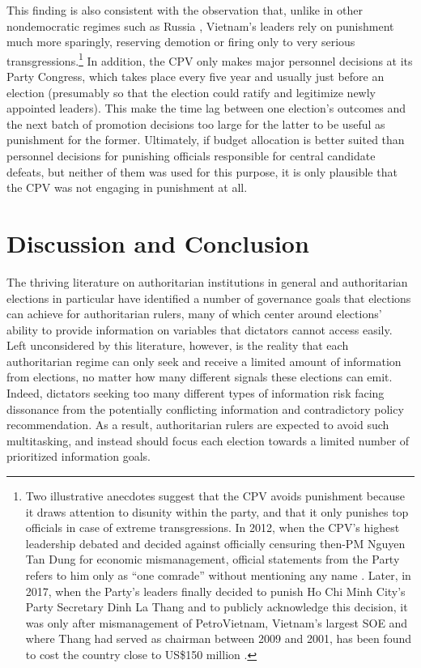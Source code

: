 \documentclass[12pt]{article}
\newcommand{\1}{\mathbbm{1}}
\begin{document}
This finding is also consistent with the observation that, unlike in other nondemocratic regimes such as Russia \citep{Myagkov2009}, Vietnam's leaders rely on punishment much more sparingly, reserving demotion or firing only to very serious transgressions.\footnote{Two illustrative anecdotes suggest that the CPV avoids punishment because it draws attention to disunity within the party, and that it only punishes top officials in case of extreme transgressions. In 2012, when the CPV's highest leadership debated and decided against officially censuring then-PM Nguyen Tan Dung for economic mismanagement, official statements from the Party refers to him only as ``one comrade'' without mentioning any name \citep{voa2012}. Later, in 2017, when the Party's leaders finally decided to punish Ho Chi Minh City's Party Secretary Dinh La Thang and to publicly acknowledge this decision, it was only after mismanagement of PetroVietnam, Vietnam's largest SOE and where Thang had served as chairman between 2009 and 2001, has been found to cost the country close to US\$150 million \citep{BBC2017}.} In addition, the CPV only makes major personnel decisions at its Party Congress, which takes place every five year and usually just before an election (presumably so that the election could ratify and legitimize newly appointed leaders). This make the time lag between one election's outcomes and the next batch of promotion decisions too large for the latter to be useful as punishment for the former. Ultimately, if budget allocation is better suited than personnel decisions for punishing officials responsible for central candidate defeats, but neither of them was used for this purpose, it is only plausible that the CPV was not engaging in punishment at all.

\section{Discussion and Conclusion}

The thriving literature on authoritarian institutions in general and authoritarian elections in particular have identified a number of governance goals that elections can achieve for authoritarian rulers, many of which center around elections' ability to provide information on variables that dictators cannot access easily. Left unconsidered by this literature, however, is the reality that each authoritarian regime can only seek and receive a limited amount of information from elections, no matter how many different signals these elections can emit. Indeed, dictators seeking too many different types of information risk facing dissonance from the potentially conflicting information and contradictory policy recommendation. As a result, authoritarian rulers are expected to avoid such multitasking, and instead should focus each election towards a limited number of prioritized information goals.
\end{document}

